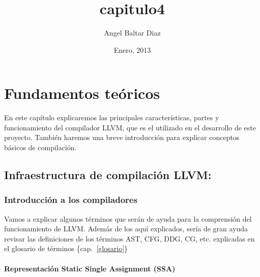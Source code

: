 


\title{capitulo4} 
\author{Angel Baltar Diaz}
\date{\Large Enero, 2013} 

\chapter {Fundamentos teóricos}
\label{capitulo3}

En este capítulo explicaremos las principales características, partes y funcionamiento del compilador LLVM, que es el utilizado en el desarrollo de este proyecto. También haremos una breve introducción para explicar conceptos básicos de compilación.

\section{Infraestructura de compilación LLVM:}

\subsection{Introducción a los compiladores}
Vamos a explicar algunos términos que serán de ayuda para la comprensión del funcionamiento de LLVM. 
Además de los aquí explicados, sería de gran ayuda revisar las definiciones de los términos AST, CFG, DDG, CG, etc. explicadas en el glosario de términos \{cap.~\ref{glosario}\} 

\subsubsection*{Representación Static Single Assignment (SSA)}

